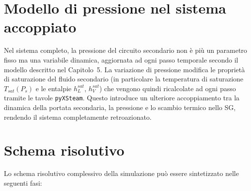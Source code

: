 \documentclass[12pt]{report}
\begin{document}
\section{Modello di pressione nel sistema accoppiato}

Nel sistema completo, la pressione del circuito secondario non è più un parametro 
fisso ma una variabile dinamica, aggiornata ad ogni passo temporale secondo il 
modello descritto nel Capitolo~5. La variazione di pressione modifica le proprietà 
di saturazione del fluido secondario (in particolare la temperatura di saturazione 
$T_{sat}(P_s)$ e le entalpie $h_L^{sat}$, $h_V^{sat}$) che vengono quindi 
ricalcolate ad ogni passo tramite le tavole \texttt{pyXSteam}. Questo introduce 
un ulteriore accoppiamento tra la dinamica della portata secondaria, la pressione 
e lo scambio termico nello SG, rendendo il sistema completamente 
retroazionato.

\section{Schema risolutivo}

Lo schema risolutivo complessivo della simulazione può essere sintetizzato nelle 
seguenti fasi:
\end{document}
